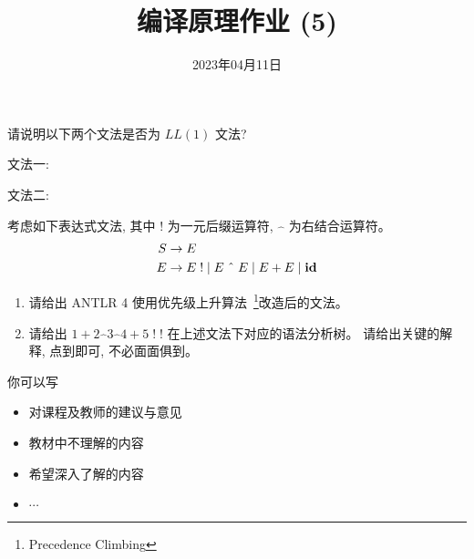 \documentclass[a4paper, justified]{tufte-handout}
\title{编译原理作业 (5)}
\date{2023年04月11日}
\begin{document}
\maketitle
\noplagiarism %
\begin{abstract}
\end{abstract}
\beginrequired

\begin{problem}
  请说明以下两个文法是否为 $LL(1)$ 文法?

  文法一:
  

  文法二:
  
\end{problem}

\begin{solution}
\end{solution}


\begin{problem}
  考虑如下表达式文法, 其中 $!$ 为一元后缀运算符, $\hat{\;\;}$ 为右结合运算符。
  \begin{align*}
    S &\to E \\
    E &\to E\;! \mid E \;\hat{\;\;}\; E \mid E + E \mid \text{\bf id}
  \end{align*}
  \begin{enumerate}[(1)]
    \item 请给出 ANTLR 4 使用优先级上升算法~\footnote{Precedence Climbing}改造后的文法。
    \item 请给出 $1 + 2 \hat{\;\;} 3 \hat{\;\;} 4 + 5\;!\;!$
      在上述文法下对应的语法分析树。
      请给出关键的解释, 点到即可, 不必面面俱到。
  \end{enumerate}
\end{problem}

\begin{solution}
\end{solution}



\beginfb

你可以写
\begin{itemize}
  \item 对课程及教师的建议与意见
  \item 教材中不理解的内容
  \item 希望深入了解的内容
  \item $\cdots$
\end{itemize}
\end{document}

